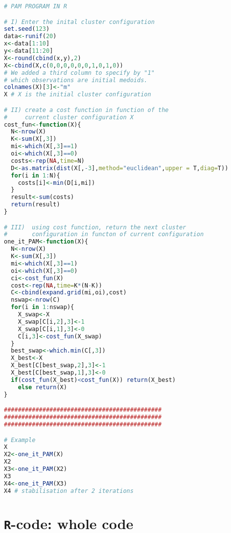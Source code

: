 \documentclass[a4paper]{book}
\begin{document}
\begin{lstlisting}[language=R]
# PAM PROGRAM IN R

# I) Enter the inital cluster configuration
set.seed(123)
data<-runif(20)
x<-data[1:10]
y<-data[11:20]
X<-round(cbind(x,y),2)
X<-cbind(X,c(0,0,0,0,0,0,1,0,1,0))
# We added a third column to specify by "1"
# which observations are initial medoids.
colnames(X)[3]<-"m"
X # X is the initial cluster configuration

# II) create a cost function in function of the
#     current cluster configuration X
cost_fun<-function(X){
  N<-nrow(X)
  K<-sum(X[,3])
  mi<-which(X[,3]==1)
  oi<-which(X[,3]==0)
  costs<-rep(NA,time=N)
  D<-as.matrix(dist(X[,-3],method="euclidean",upper = T,diag=T))
  for(i in 1:N){
    costs[i]<-min(D[i,mi])
  }
  result<-sum(costs)
  return(result)
}

# III)  using cost function, return the next cluster
#       configuration in functon of current configuration
one_it_PAM<-function(X){
  N<-nrow(X)
  K<-sum(X[,3])
  mi<-which(X[,3]==1)
  oi<-which(X[,3]==0)
  ci<-cost_fun(X)
  cost<-rep(NA,time=K*(N-K))
  C<-cbind(expand.grid(mi,oi),cost)
  nswap<-nrow(C)
  for(i in 1:nswap){
    X_swap<-X
    X_swap[C[i,2],3]<-1
    X_swap[C[i,1],3]<-0
    C[i,3]<-cost_fun(X_swap)
  }
  best_swap<-which.min(C[,3])
  X_best<-X
  X_best[C[best_swap,2],3]<-1
  X_best[C[best_swap,1],3]<-0
  if(cost_fun(X_best)<cost_fun(X)) return(X_best)
    else return(X)
}

#############################################
#############################################
#############################################

# Example
X
X2<-one_it_PAM(X)
X2
X3<-one_it_PAM(X2)
X3
X4<-one_it_PAM(X3)
X4 # stabilisation after 2 iterations
\end{lstlisting}

\chapter*{\texttt{R}-code: whole code}
\end{document}
